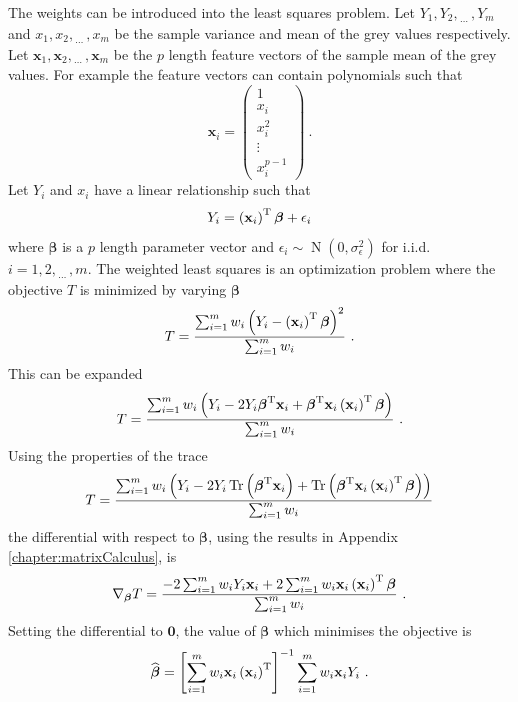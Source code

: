 \documentclass[12pt]{report}
\DeclareMathOperator{\trace}{Tr}
\DeclareMathOperator{\normal}{N}
\newcommand{\T}{^\textup{T}}
\newcommand{\dotdotdot}{_{\phantom{.}\cdots}}
\newcommand{\vect}[1]{\mathbf{#1}}
\newcommand{\vectGreek}[1]{\boldsymbol{#1}}
\begin{document}
The weights can be introduced into the least squares problem. Let $Y_1,Y_2,\dotdotdot,Y_m$ and $x_1,x_2,\dotdotdot,x_m$ be the sample variance and mean of the grey values respectively. Let $\vect{x}_1,\vect{x}_2,\dotdotdot,\vect{x}_m$ be the $p$ length feature vectors of the sample mean of the grey values. For example the feature vectors can contain polynomials such that
\begin{equation*}
\vect{x}_i=
\begin{pmatrix}
	1\\x_i\\x_i^2\\\vdots\\x_i^{p-1}
\end{pmatrix} \ .
\end{equation*}
Let $Y_i$ and $x_i$ have a linear relationship such that
\begin{equation}
Y_i = \left(\vect{x}_i\right)\T\vectGreek{\beta} + \epsilon_i
\end{equation}
where $\vectGreek{\beta}$ is a $p$ length parameter vector and $\epsilon_i\sim\normal(0,\sigma_{\epsilon}^2)$ for i.i.d.~$i=1,2,\dotdotdot,m$. The weighted least squares is an optimization problem where the objective $T$ is minimized by varying $\vectGreek{\beta}$
\begin{equation}
T =
\frac{\sum_{i=1}^mw_i\left(Y_i-\left(\vect{x}_i\right)\T\vectGreek{\beta}\right)^2}
{\sum_{i=1}^mw_i} \ .
\end{equation}
This can be expanded
\begin{equation*}
T =
\frac{\sum_{i=1}^mw_i\left(Y_i-2Y_i\vectGreek{\beta}\T\vect{x}_i+\vectGreek{\beta}\T\vect{x}_i\left(\vect{x}_i\right)\T\vectGreek{\beta}\right)}
{\sum_{i=1}^mw_i} \ .
\end{equation*}
Using the properties of the trace
\begin{equation*}
T =
\frac{\sum_{i=1}^mw_i\left(Y_i-2Y_i\trace\left(\vectGreek{\beta}\T\vect{x}_i\right)+\trace\left(\vectGreek{\beta}\T\vect{x}_i\left(\vect{x}_i\right)\T\vectGreek{\beta}\right)\right)}
{\sum_{i=1}^mw_i}
\end{equation*}
the differential with respect to $\vectGreek{\beta}$, using the results in Appendix \ref{chapter:matrixCalculus}, is
\begin{equation*}
\nabla_{\vectGreek{\beta}}T = \frac{-2\sum_{i=1}^mw_iY_i\vect{x}_i+2\sum_{i=1}^mw_i\vect{x}_i\left(\vect{x}_i\right)\T\vectGreek{\beta}}{\sum_{i=1}^mw_i} \ .
\end{equation*}
Setting the differential to $\vect{0}$, the value of $\vectGreek{\beta}$ which minimises the objective is 
\begin{equation}
\widehat{\vectGreek{\beta}}=\left[\sum_{i=1}^mw_i\vect{x}_i\left(\vect{x}_i\right)\T\right]^{-1}\sum_{i=1}^mw_i\vect{x}_iY_i \ .
\end{equation}
\end{document}

